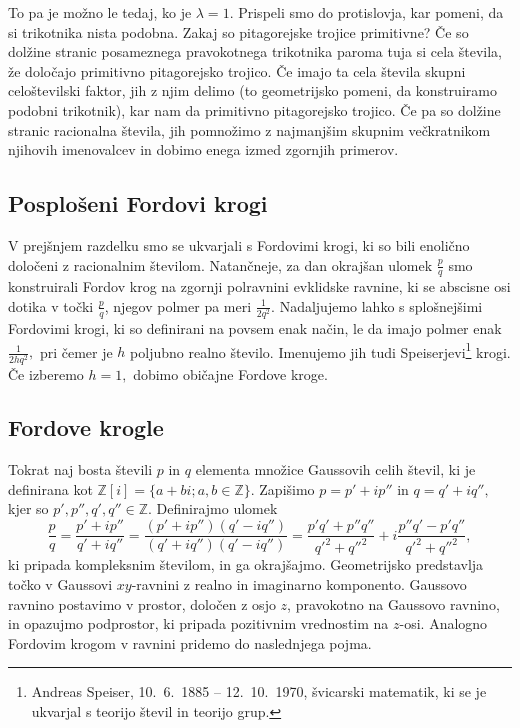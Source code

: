 \documentclass[mat1]{fmfdelo}
\newcommand{\Z}{\mathbb Z}
\begin{document}
\begin{dokaz}
To pa je možno le tedaj, ko je $\lambda=1.$ Prispeli smo do protislovja, kar pomeni, da si trikotnika nista podobna.
%
Zakaj so pitagorejske trojice primitivne?
Če so dolžine stranic posameznega pravokotnega trikotnika paroma tuja si cela števila, že določajo primitivno pitagorejsko trojico.
Če imajo ta cela števila skupni celoštevilski faktor, jih z njim delimo (to geometrijsko pomeni, da konstruiramo podobni trikotnik), kar nam da primitivno pitagorejsko trojico.
Če pa so dolžine stranic racionalna števila, jih pomnožimo z najmanjšim skupnim večkratnikom njihovih imenovalcev in dobimo enega izmed zgornjih primerov.
\end{dokaz}

\subsection{Posplošeni Fordovi krogi}

V prejšnjem razdelku smo se ukvarjali s Fordovimi krogi, ki so bili enolično določeni z racionalnim številom. Natančneje, za dan okrajšan ulomek $\frac{p}{q}$ smo konstruirali Fordov krog na zgornji polravnini evklidske ravnine, ki se abscisne osi dotika v točki $\frac{p}{q}$, njegov polmer pa meri $\frac{1}{2q^2}.$
Nadaljujemo lahko s splošnejšimi Fordovimi krogi, ki so definirani na povsem enak način, le da imajo polmer enak $\frac{1}{2hq^2},$ pri čemer je $h$ poljubno realno število. Imenujemo jih tudi Speiserjevi\footnote{Andreas Speiser, 10.~6.~1885 -- 12.~10.~1970, švicarski matematik, ki se je ukvarjal s teorijo števil in teorijo grup.} krogi. Če izberemo $h=1,$ dobimo običajne Fordove kroge.

\subsection{Fordove krogle}

Tokrat naj bosta števili $p$ in $q$ elementa množice Gaussovih celih števil, ki je definirana kot $\mathbb{Z}\left[{i}\right] = \{a+bi; a,b \in \Z \}.$ Zapišimo $p = p'+ip''$ in $q = q'+iq'',$ kjer so $p', p'', q', q'' \in \Z.$ Definirajmo ulomek 
\[ \frac{p}{q} = \frac{p'+ip''}{q'+iq''} = \frac{(p'+ip'')(q'-iq'')}{(q'+iq'')(q'-iq'')} = \frac{p'q'+p''q''}{q'^2+q''^2} + i \frac{p''q'-p'q''}{q'^2+q''^2}, \]
ki pripada kompleksnim številom, in ga okrajšajmo. Geometrijsko predstavlja točko v Gaussovi $xy$-ravnini z realno in imaginarno komponento. Gaussovo ravnino postavimo v prostor, določen z osjo $z$, pravokotno na Gaussovo ravnino, in opazujmo podprostor, ki pripada pozitivnim vrednostim na $z$-osi. Analogno Fordovim krogom v ravnini pridemo do naslednjega pojma. 
\end{document}
